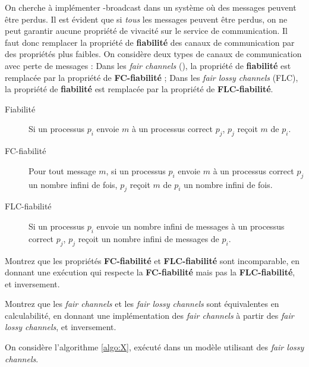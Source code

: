 
\begingroup


\begin{exercice}
  
  On cherche à implémenter \RB-broadcast dans un système où des messages peuvent être perdus.
  Il est évident que si \emph{tous} les messages peuvent être perdus, on ne peut garantir
  aucune propriété de vivacité sur le service de communication.
  Il faut donc remplacer la propriété de \textbf{fiabilité}
  des canaux de communication par des propriétés plus faibles.
  On considère deux types de canaux de communication avec perte de messages :
  Dans les \emph{fair channels} (\FC), la propriété de \textbf{fiabilité} est remplacée par la propriété de \textbf{FC-fiabilité} ;
  Dans les \emph{fair lossy channels} (FLC), la propriété de \textbf{fiabilité} est remplacée par la propriété de \textbf{FLC-fiabilité}. 
  \begin{description}
  \item[Fiabilité] Si un processus $p_i$ envoie $m$ à un processus correct $p_j$, $p_j$ reçoit $m$ de $p_i$.
  \item[FC-fiabilité] Pour tout message $m$, si un processus $p_i$ envoie $m$ à un processus correct $p_j$ un nombre infini de fois,
    $p_j$ reçoit $m$ de $p_i$ un nombre infini de fois.
  \item[FLC-fiabilité] Si un processus $p_i$ envoie un nombre infini de messages à un processus correct $p_j$,
    $p_j$ reçoit un nombre infini de messages de $p_i$.
  \end{description}

  \begin{questions}
  \item Montrez que les propriétés \textbf{FC-fiabilité} et \textbf{FLC-fiabilité} sont incomparable, en donnant une exécution qui
    respecte la \textbf{FC-fiabilité} mais pas la \textbf{FLC-fiabilité}, et inversement.
  \item Montrez que les \emph{fair channels} et les \emph{fair lossy channels} sont équivalentes en calculabilité,
    en donnant une implémentation des \emph{fair channels} à partir des \emph{fair lossy channels}, et inversement.
  \end{questions}
  On considère l'algorithme \ref{algo:X}, exécuté dans un modèle utilisant des \emph{fair lossy channels}.
  

\end{exercice}
